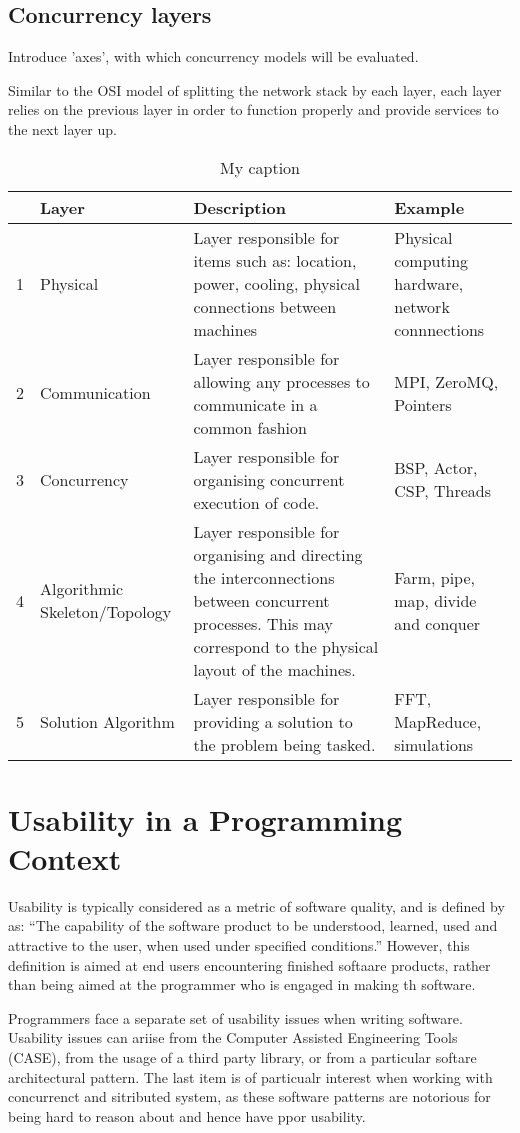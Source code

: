 \documentclass{sig-alternate}
\begin{document}
\subsection{Concurrency layers}
Introduce 'axes', with which concurrency models will be evaluated.

Similar to the OSI model of splitting the network stack by each layer, each layer relies on the previous layer in order to function properly and provide services to the next layer up.

\begin{table}[]
\centering
\caption{My caption}
\label{my-label}
\begin{tabular}{llll}
 & Layer & Description & Example \\ \hline
1 & Physical & Layer responsible for items such as: location, power, cooling, physical connections between machines & Physical computing hardware, network connnections \\
2 & Communication & Layer responsible for allowing any processes to communicate in a common fashion & MPI, ZeroMQ, Pointers \\
3 & Concurrency & Layer responsible for organising concurrent execution of code. & BSP, Actor, CSP, Threads \\
4 & Algorithmic Skeleton/Topology & Layer responsible for organising and directing the interconnections between concurrent processes. This may correspond to the physical layout of the machines. & Farm, pipe, map, divide and conquer\\
5 & Solution Algorithm & Layer responsible for providing a solution to the problem being tasked. & FFT, MapReduce, simulations
\end{tabular}
\end{table}

\section{Usability in a Programming Context}
Usability is typically considered as a metric of software quality, and is defined by \cite{9126} as: ``The capability of the software product to be understood, learned, used and attractive to the user, when used under specified conditions.'' However, this definition is aimed at end users encountering finished softaare products, rather than being aimed at the programmer who is engaged in making th software.

Programmers face a separate set of usability issues when writing software. Usability issues can ariise from the Computer Assisted Engineering Tools (CASE), from the usage of a third party library, or from a particular softare architectural pattern. The last item is of particualr interest when working with concurrenct and sitributed system, as these software patterns are notorious for being hard to reason about and hence have ppor usability.
\end{document}
